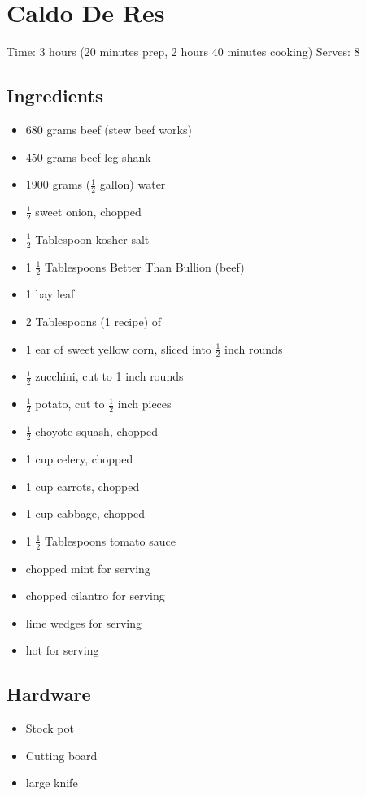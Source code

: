 \section{Caldo De Res}
\label{caldoDeRes}
\setcounter{secnumdepth}{0}
Time: 3 hours (20 minutes prep, 2 hours 40 minutes cooking)
Serves: 8

\begin{multicols}{2}
\subsection*{Ingredients}
\begin{itemize}
    \item 680 grams beef (stew beef works)
    \item 450 grams beef leg shank
    \item 1900 grams (\( \frac{1}{2} \) gallon) water
    \item \( \frac{1}{2} \) sweet onion, chopped
    \item \( \frac{1}{2} \) Tablespoon kosher salt
    \item 1 \( \frac{1}{2} \) Tablespoons Better Than Bullion (beef)
    \item 1 bay leaf
    \item 2 Tablespoons (1 recipe) of 
    \item 1 ear of sweet yellow corn, sliced into \( \frac{1}{2} \) inch rounds
    \item \( \frac{1}{2} \) zucchini, cut to 1 inch rounds
    \item \( \frac{1}{2} \) potato, cut to \( \frac{1}{2} \) inch pieces
    \item \( \frac{1}{2} \) choyote squash, chopped
    \item 1 cup celery, chopped
    \item 1 cup carrots, chopped
    \item 1 cup cabbage, chopped
    \item 1 \( \frac{1}{2} \) Tablespoons tomato sauce
    \item chopped mint for serving
    \item chopped cilantro for serving
    \item lime wedges for serving
    \item hot  for serving
\end{itemize}

\subsection*{Hardware}
\begin{itemize}
    \item Stock pot
    \item Cutting board
    \item large knife
\end{itemize}
\clearpage


\end{multicols}
